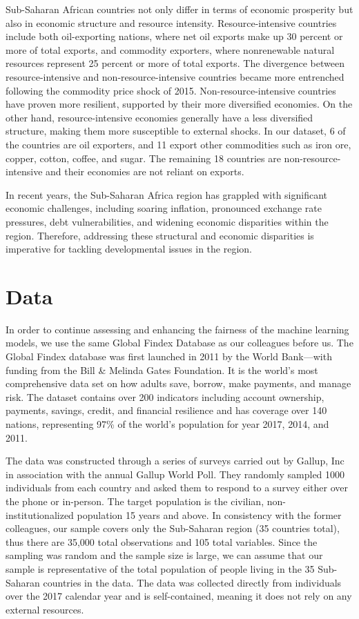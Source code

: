 \documentclass[12pt]{article}
\begin{document}
Sub-Saharan African countries not only differ in terms of economic
prosperity but also in economic structure and resource intensity.
Resource-intensive countries include both oil-exporting nations, where
net oil exports make up 30 percent or more of total exports, and
commodity exporters, where nonrenewable natural resources represent 25
percent or more of total exports. The divergence between
resource-intensive and non-resource-intensive countries became more
entrenched following the commodity price shock of 2015.
Non-resource-intensive countries have proven more resilient, supported
by their more diversified economies. On the other hand,
resource-intensive economies generally have a less diversified
structure, making them more susceptible to external shocks. In our
dataset, 6 of the countries are oil exporters, and 11 export other
commodities such as iron ore, copper, cotton, coffee, and sugar. The
remaining 18 countries are non-resource-intensive and their economies
are not reliant on exports.

In recent years, the Sub-Saharan Africa region has grappled with
significant economic challenges, including soaring inflation, pronounced
exchange rate pressures, debt vulnerabilities, and widening economic
disparities within the region. Therefore, addressing these structural
and economic disparities is imperative for tackling developmental issues
in the region.

\hypertarget{data}{%
\section{Data}\label{data}}

In order to continue assessing and enhancing the fairness of the machine
learning models, we use the same Global Findex Database as our
colleagues before us. The Global Findex database was first launched in
2011 by the World Bank---with funding from the Bill \& Melinda Gates
Foundation. It is the world's most comprehensive data set on how adults
save, borrow, make payments, and manage risk. The dataset contains over
200 indicators including account ownership, payments, savings, credit,
and financial resilience and has coverage over 140 nations, representing
97\% of the world's population for year 2017, 2014, and 2011.

The data was constructed through a series of surveys carried out by
Gallup, Inc in association with the annual Gallup World Poll. They
randomly sampled 1000 individuals from each country and asked them to
respond to a survey either over the phone or in-person. The target
population is the civilian, non-institutionalized population 15 years
and above. In consistency with the former colleagues, our sample covers
only the Sub-Saharan region (35 countries total), thus there are 35,000
total observations and 105 total variables. Since the sampling was
random and the sample size is large, we can assume that our sample is
representative of the total population of people living in the 35
Sub-Saharan countries in the data. The data was collected directly from
individuals over the 2017 calendar year and is self-contained, meaning
it does not rely on any external resources.
\end{document}
